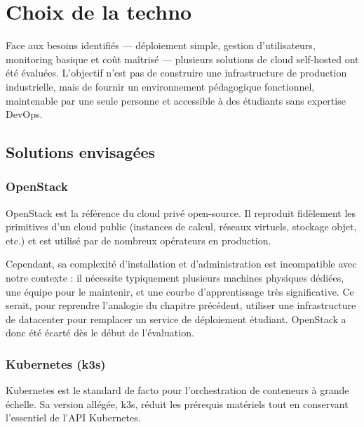 \documentclass{rapportClass} %
\begin{document}


\chapter{Choix de la techno}

Face aux besoins identifiés — déploiement simple, gestion d'utilisateurs, monitoring basique et coût maîtrisé —
plusieurs solutions de cloud self-hosted ont été évaluées. L'objectif n'est pas de construire une infrastructure 
de production industrielle, mais de fournir un environnement pédagogique fonctionnel, maintenable par une seule 
personne et accessible à des étudiants sans expertise DevOps.

\section{Solutions envisagées}

\subsection{OpenStack}
OpenStack est la référence du cloud privé open-source. Il reproduit fidèlement les primitives d'un cloud public 
(instances de calcul, réseaux virtuels, stockage objet, etc.) et est utilisé par de nombreux opérateurs en production.

Cependant, sa complexité d'installation et d'administration est incompatible avec notre contexte : 
il nécessite typiquement plusieurs machines physiques dédiées, une équipe pour le maintenir, 
et une courbe d'apprentissage très significative. Ce serait, pour reprendre l'analogie du chapitre précédent, 
utiliser une infrastructure de datacenter pour remplacer un service de déploiement étudiant. 
OpenStack a donc été écarté dès le début de l'évaluation.

\subsection{Kubernetes (k3s)}
Kubernetes est le standard de facto pour l'orchestration de conteneurs à grande échelle. 
Sa version allégée, k3s, réduit les prérequis matériels tout en conservant l'essentiel de l'API Kubernetes.
\end{document}
